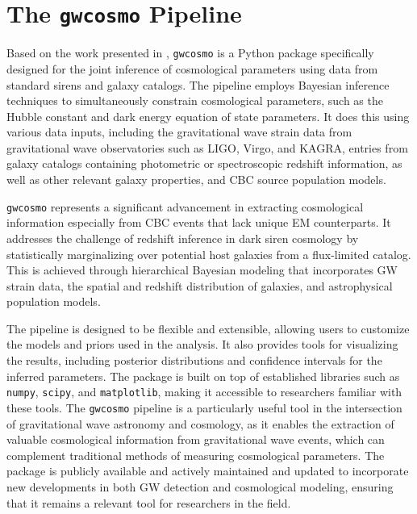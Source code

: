 \chapter{The \texttt{gwcosmo} Pipeline}
\label{chap:gwcosmo}

Based on the work presented in \citet{gray2020cosmological,gray2022pixelated,gray2023joint}, \texttt{gwcosmo} is a Python package specifically designed for the joint inference of cosmological parameters using data from standard sirens and galaxy catalogs.  The pipeline employs Bayesian inference techniques to simultaneously constrain cosmological parameters, such as the Hubble constant and dark energy equation of state parameters. It does this using various data inputs, including the gravitational wave strain data from gravitational wave observatories such as LIGO, Virgo, and KAGRA, entries from galaxy catalogs containing photometric or spectroscopic redshift information, as well as other relevant galaxy properties, and \ac{CBC} source population models. 

\texttt{gwcosmo} represents a significant advancement in extracting cosmological information especially from \ac{CBC} events that lack unique \ac{EM} counterparts. It addresses the challenge of redshift inference in dark siren cosmology by statistically marginalizing over potential host galaxies from a flux-limited catalog. This is achieved through hierarchical Bayesian modeling that incorporates \ac{GW} strain data, the spatial and redshift distribution of galaxies, and astrophysical population models.

The pipeline is designed to be flexible and extensible, allowing users to customize the models and priors used in the analysis. It also provides tools for visualizing the results, including posterior distributions and confidence intervals for the inferred parameters. The package is built on top of established libraries such as \texttt{numpy}, \texttt{scipy}, and \texttt{matplotlib}, making it accessible to researchers familiar with these tools.
The \texttt{gwcosmo} pipeline is a particularly useful tool in the intersection of gravitational wave astronomy and cosmology, as it enables the extraction of valuable cosmological information from gravitational wave events, which can complement traditional methods of measuring cosmological parameters. The package is publicly available and actively maintained and updated to incorporate new developments in both \ac{GW} detection and cosmological modeling, ensuring that it remains a relevant tool for researchers in the field.

